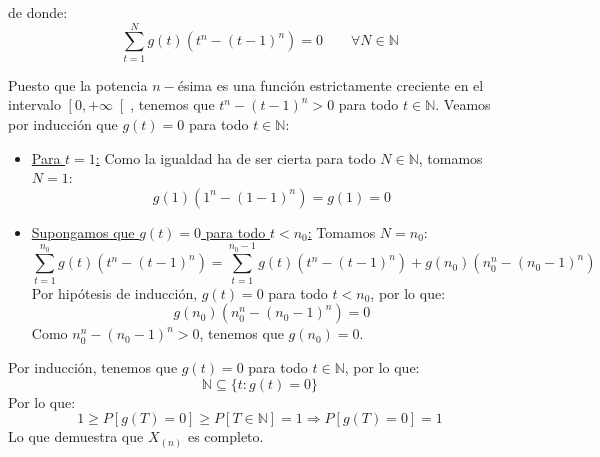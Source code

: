\begin{ejercicio}
    de donde:
    \begin{equation*}
        \sum_{t=1}^{N}g(t)(t^n -{(t-1)}^{n}) = 0 \qquad \forall N\in \mathbb{N}
    \end{equation*}

    Puesto que la potencia $n-$ésima es una función estrictamente creciente en el intervalo $\left[0,+\infty\right[$, tenemos que $t^n - {(t-1)}^{n} > 0$ para todo $t\in \mathbb{N}$. Veamos por inducción que $g(t) = 0$ para todo $t\in \mathbb{N}$:
    \begin{itemize}
        \item \underline{Para $t=1$:}
        Como la igualdad ha de ser cierta para todo $N\in \mathbb{N}$, tomamos $N=1$:
        \begin{equation*}
            g(1)(1^n - {(1-1)}^{n}) = g(1) = 0
        \end{equation*}
        \item \underline{Supongamos que $g(t) = 0$ para todo $t<n_0$:}
        Tomamos $N=n_0$:
        \begin{equation*}
            \sum_{t=1}^{n_0}g(t)(t^n -{(t-1)}^{n}) = \sum_{t=1}^{n_0-1}g(t)(t^n -{(t-1)}^{n}) + g(n_0)(n_0^n -{(n_0-1)}^{n})
        \end{equation*}
        Por hipótesis de inducción, $g(t) = 0$ para todo $t<n_0$, por lo que:
        \begin{equation*}
            g(n_0)(n_0^n -{(n_0-1)}^{n}) = 0
        \end{equation*}
        Como $n_0^n -{(n_0-1)}^{n} > 0$, tenemos que $g(n_0) = 0$.
    \end{itemize}
    Por inducción, tenemos que $g(t) = 0$ para todo $t\in \mathbb{N}$, por lo que:
    \begin{equation*}
        \mathbb{N} \subseteq \{t:g(t) = 0\}
    \end{equation*}
    Por lo que:
    \begin{equation*}
        1 \geq P[g(T) = 0] \geq P[T \in \mathbb{N}] = 1 \Longrightarrow P[g(T)= 0] = 1
    \end{equation*}
    Lo que demuestra que $X_{(n)}$ es completo.


\end{ejercicio}
